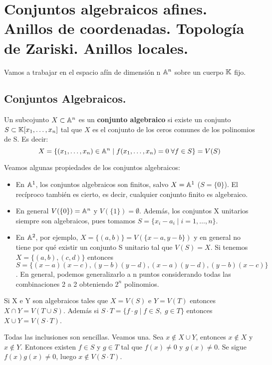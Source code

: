 \documentclass[ACGA.tex]{subfiles}
\begin{document}
\chapter{Conjuntos algebraicos afines. Anillos de coordenadas. Topología de Zariski. Anillos locales.}
Vamos a trabajar en el espacio afín de dimensión n $\mathbb{A}^n$ sobre un cuerpo $\mathbb{K}$ fijo. 
\section{Conjuntos Algebraicos.}
\begin{defi}
Un subcojunto $X\subset \mathbb{A}^n$ es un \textbf{conjunto algebraico} si existe un conjunto $S\subset \mathbb{K}[x_1,\dotsc,x_n]$ tal que $X$ es el conjunto de los ceros comunes de los polinomios de S. Es decir:
\[
X=\{(x_1,\dotsc,x_n)\in\mathbb{A}^n\mid f(x_1,\dotsc,x_n)=0\;\forall f\in S\}=V(S)
\]
\end{defi}
\begin{prop}Veamos algunas propiedades de los conjuntos algebraicos:
\begin{itemize}
\item En $\mathbb{A}^1$, los conjuntos algebraicos son finitos, salvo $X=\mathbb{A}^1$ ($S=\{0\}$). El recíproco también es cierto, es decir, cualquier conjunto finito es algebraico.
\item En general $V(\{0\})=\mathbb{A}^n$ y $V(\{1\})=\emptyset$. Además, los conjuntos X unitarios siempre son algebraicos, pues tomamos $S=\{x_i-a_i\mid i=1,\dotsc,n\}$.
\item En $\mathbb{A}^2$, por ejemplo, $X=\{(a,b)\} = V(\{x-a,y-b\})$ y en general no tiene por qué existir un conjunto S unitario tal que $V(S)=X$. Si tenemos $X=\{(a,b),(c,d)\}$ entonces $S=\{(x-a)(x-c),(y-b)(y-d), (x-a)(y-d), (y-b)(x-c)\}$. En general, podemos generalizarlo a n puntos considerando todas las combinaciones 2 a 2 obteniendo $2^n$ polinomios.
\end{itemize}
\end{prop}
\begin{prop}
Si X e Y son algebraicos tales que $X=V(S)$ e $Y=V(T)$ entonces $X\cap Y = V(T\cup S)$. Además si $S\cdot T = \{f\cdot g \mid f \in S,\; g \in T\}$ entonces $X\cup Y = V(S\cdot T)$. 
\end{prop}
\begin{dem}
Todas las inclusiones son sencillas. Veamos una. Sea $x\notin X\cup Y$, entonces $x\notin X$ y $x\notin Y$. Entonces existen $f\in S$ y $g\in T$ tal que $f(x)\neq 0$ y $g(x)\neq 0$. Se sigue $f(x)g(x)\neq 0$, luego $x\notin V(S\cdot T)$. 
\end{dem}
\end{document}

